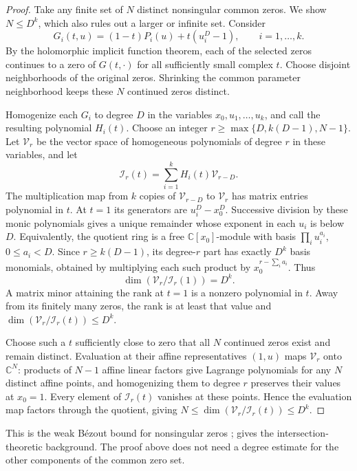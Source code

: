 \begin{proof}
Take any finite set of $N$ distinct nonsingular common zeros. We show
$N\le D^k$, which also rules out a larger or infinite set. Consider
\[
 G_i(t,u)=(1-t)P_i(u)+t(u_i^D-1),\qquad i=1,\ldots,k.
\]
By the holomorphic implicit function theorem, each of the selected zeros
continues to a zero of $G(t,\cdot)$ for all sufficiently small complex $t$.
Choose disjoint neighborhoods of the original zeros. Shrinking the common
parameter neighborhood keeps these $N$ continued zeros distinct.

Homogenize each $G_i$ to degree $D$ in the variables $x_0,u_1,\ldots,u_k$,
and call the resulting polynomial $H_i(t)$. Choose an integer
$r\ge\max\{D,k(D-1),N-1\}$. Let $\mathcal V_r$ be the vector space of
homogeneous polynomials of degree $r$ in these variables, and let
\[
 \mathcal I_r(t)=\sum_{i=1}^k H_i(t)\mathcal V_{r-D}.
\]
The multiplication map from $k$ copies of $\mathcal V_{r-D}$ to
$\mathcal V_r$ has matrix entries polynomial in $t$. At $t=1$ its generators
are $u_i^D-x_0^D$. Successive division by these monic polynomials gives a
unique remainder whose exponent in each $u_i$ is below $D$. Equivalently,
the quotient ring is a free $\mathbb C[x_0]$-module with basis
$\prod_i u_i^{a_i}$, $0\le a_i<D$. Since $r\ge k(D-1)$, its degree-$r$
part has exactly $D^k$ basis monomials, obtained by multiplying each such
product by $x_0^{r-\sum_i a_i}$. Thus
\[
 \dim(\mathcal V_r/\mathcal I_r(1))=D^k.
\]
A matrix minor attaining the rank at $t=1$ is a nonzero polynomial in $t$.
Away from its finitely many zeros, the rank is at least that value and
$\dim(\mathcal V_r/\mathcal I_r(t))\le D^k$.

Choose such a $t$ sufficiently close to zero that all $N$ continued zeros
exist and remain distinct. Evaluation at their affine representatives
$(1,u)$ maps $\mathcal V_r$ onto $\mathbb C^N$: products of $N-1$ affine
linear factors give Lagrange polynomials for any $N$ distinct affine points,
and homogenizing them to degree $r$ preserves their values at $x_0=1$.
Every element of $\mathcal I_r(t)$ vanishes at these points. Hence the
evaluation map factors through the quotient, giving
$N\le\dim(\mathcal V_r/\mathcal I_r(t))\le D^k$.
\end{proof}

This is the weak B\'ezout bound for nonsingular zeros
\citep[Theorem~4.106]{basu2006-algorithms-in-real-algebraic-geometry};
\citet{fulton1998-intersection-theory} gives the intersection-theoretic
background. The proof above does not need a degree estimate for the other
components of the common zero set.

